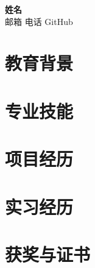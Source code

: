 \documentclass[11pt,a4paper]{article}
\begin{document}
\begin{center}
{\LARGE \textbf{姓名}}\\[4pt]
邮箱 \textbar{} 电话 \textbar{} GitHub
\end{center}

\section*{教育背景}

\section*{专业技能}

\section*{项目经历}

\section*{实习经历}

\section*{获奖与证书}
\end{document}
